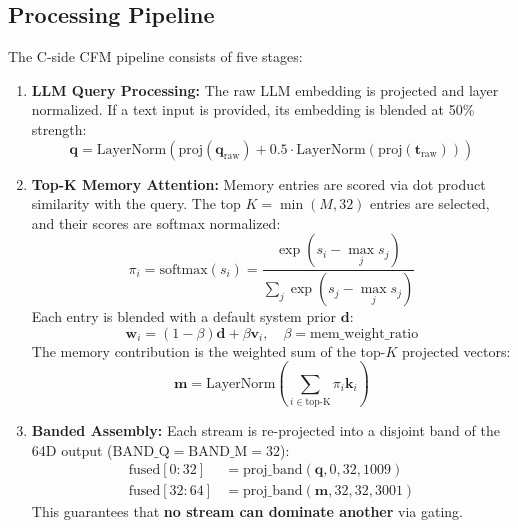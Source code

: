 \documentclass[12pt]{article}
\begin{document}
\subsection{Processing Pipeline}
\label{subsec:pipeline}

The C-side CFM pipeline consists of five stages:

\begin{enumerate}
    \item \textbf{LLM Query Processing:}
    The raw LLM embedding is projected and layer normalized. If a
    text input is provided, its embedding is blended at 50\% strength:
    \begin{equation}
        \mathbf{q} = \text{LayerNorm}\left(
        \text{proj}(\mathbf{q}_{\text{raw}}) + 0.5 \cdot
        \text{LayerNorm}(\text{proj}(\mathbf{t}_{\text{raw}}))
        \right)
    \end{equation}

    \item \textbf{Top-K Memory Attention:}
    Memory entries are scored via dot product similarity with the
    query. The top $K = \min(M, 32)$ entries are selected, and their
    scores are softmax normalized:
    \begin{equation}
        \pi_i = \text{softmax}(s_i) =
        \frac{\exp(s_i - \max_j s_j)}{\sum_j \exp(s_j - \max_j s_j)}
    \end{equation}
    Each entry is blended with a default system prior $\mathbf{d}$:
    \begin{equation}
        \mathbf{w}_i = (1 - \beta) \mathbf{d} + \beta \mathbf{v}_i,
        \quad \beta = \text{mem\_weight\_ratio}
    \end{equation}
    The memory contribution is the weighted sum of the top-$K$
    projected vectors:
    \begin{equation}
        \mathbf{m} = \text{LayerNorm}\left(
        \sum_{i \in \text{top-K}} \pi_i \mathbf{k}_i\right)
    \end{equation}

    \item \textbf{Banded Assembly:}
    Each stream is re-projected into a disjoint band of the 64D
    output ($\text{BAND\_Q} = \text{BAND\_M} = 32$):
    \begin{align}
        \text{fused}[0:32]  &=
            \text{proj\_band}(\mathbf{q},  0, 32, 1009) \\
        \text{fused}[32:64] &=
            \text{proj\_band}(\mathbf{m}, 32, 32, 3001)
    \end{align}
    This guarantees that \textbf{no stream can dominate another} via
    gating.


\end{enumerate}
\end{document}
